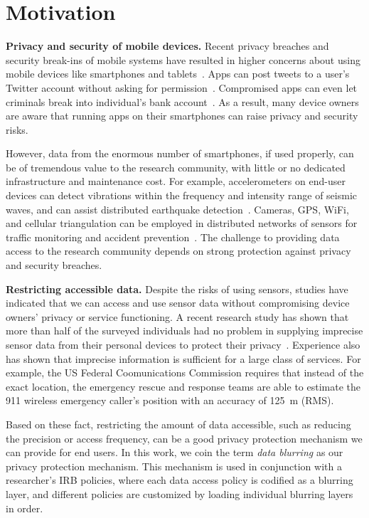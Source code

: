 \section{Motivation}\label{sec-motivation}

\textbf{Privacy and security of mobile devices.}
Recent privacy breaches and security break-ins of mobile systems 
have resulted in higher concerns about using mobile devices like 
smartphones and tablets~\cite{breach}. Apps can post tweets to a 
user's Twitter account without asking for permission~\cite{tweet}. 
Compromised apps can even let criminals break into individual's 
bank account~\cite{starbucks}. As a result, many device owners 
are aware that running apps on their smartphones can raise privacy 
and security risks. 

However, data from the enormous number of smartphones, 
if used properly, can be of tremendous value to the research 
community, with little or no dedicated infrastructure and maintenance 
cost. For example, accelerometers on end-user devices can 
detect vibrations within the frequency and intensity range of 
seismic waves, and can assist distributed earthquake 
detection~\cite{faulkner2011next}. Cameras, GPS, WiFi, and 
cellular triangulation can be employed in distributed networks 
of sensors for traffic monitoring and accident 
prevention~\cite{mohan2008nericell, thiagarajan2009vtrack}. 
The challenge to providing data access to the research community
depends on strong protection against privacy and security breaches.

\textbf{Restricting accessible data.}
Despite the risks of using sensors, 
studies have indicated that we can access and use sensor data 
without compromising device owners' privacy or service functioning.
A recent research study has shown that more than half of the 
surveyed individuals had no problem in supplying imprecise 
sensor data from their personal devices to protect their 
privacy~\cite{fawaz2014location}. Experience also has shown 
that imprecise information is sufficient for a large class of 
services. For example, the US Federal Coomunications 
Commission requires that instead of the exact location, the 
emergency rescue and response teams are able to estimate the 911 
wireless emergency caller's position with an accuracy of 125~m 
(RMS). 

Based on these fact, restricting 
the amount of data accessible, such as reducing the precision or 
access frequency, can be a good privacy protection mechanism we can 
provide for end users. In this work, we coin the term \textit{data blurring}
as our privacy protection mechanism. This mechanism is used in 
conjunction with a researcher's IRB policies, where each data access
policy is codified as a blurring layer, and different policies are
customized by loading individual blurring layers in order.